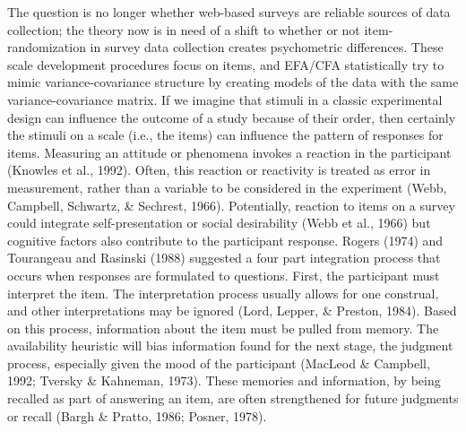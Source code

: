 \documentclass[english,man]{apa6}
\theoremstyle{definition}
\theoremstyle{definition}
\theoremstyle{definition}
\theoremstyle{remark}
\begin{document}
The question is no longer whether web-based surveys are reliable sources
of data collection; the theory now is in need of a shift to whether or
not item-randomization in survey data collection creates psychometric
differences. These scale development procedures focus on items, and
EFA/CFA statistically try to mimic variance-covariance structure by
creating models of the data with the same variance-covariance matrix. If
we imagine that stimuli in a classic experimental design can influence
the outcome of a study because of their order, then certainly the
stimuli on a scale (i.e., the items) can influence the pattern of
responses for items. Measuring an attitude or phenomena invokes a
reaction in the participant (Knowles et al., 1992). Often, this reaction
or reactivity is treated as error in measurement, rather than a variable
to be considered in the experiment (Webb, Campbell, Schwartz, \&
Sechrest, 1966). Potentially, reaction to items on a survey could
integrate self-presentation or social desirability (Webb et al., 1966)
but cognitive factors also contribute to the participant response.
Rogers (1974) and Tourangeau and Rasinski (1988) suggested a four part
integration process that occurs when responses are formulated to
questions. First, the participant must interpret the item. The
interpretation process usually allows for one construal, and other
interpretations may be ignored (Lord, Lepper, \& Preston, 1984). Based
on this process, information about the item must be pulled from memory.
The availability heuristic will bias information found for the next
stage, the judgment process, especially given the mood of the
participant (MacLeod \& Campbell, 1992; Tversky \& Kahneman, 1973).
These memories and information, by being recalled as part of answering
an item, are often strengthened for future judgments or recall (Bargh \&
Pratto, 1986; Posner, 1978).
\end{document}
